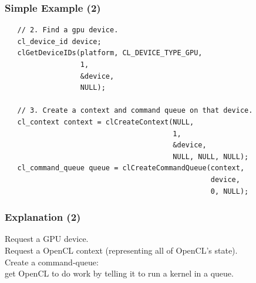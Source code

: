 \begin{frame}[fragile]
  \frametitle{Simple Example (2)}



  \begin{lstlisting}
   // 2. Find a gpu device.
   cl_device_id device;
   clGetDeviceIDs(platform, CL_DEVICE_TYPE_GPU,
                  1,
                  &device,
                  NULL);

   // 3. Create a context and command queue on that device.
   cl_context context = clCreateContext(NULL,
                                        1,
                                        &device,
                                        NULL, NULL, NULL);
   cl_command_queue queue = clCreateCommandQueue(context,
                                                 device,
                                                 0, NULL);
  \end{lstlisting}

\end{frame}

\begin{frame}
  \frametitle{Explanation (2)}


    Request a GPU device.\\[1em]

    Request a OpenCL context (representing all of OpenCL's state).\\[1em]

    Create a command-queue: \\
 get OpenCL to do work by telling it to run
      a kernel in a queue.

\end{frame}

